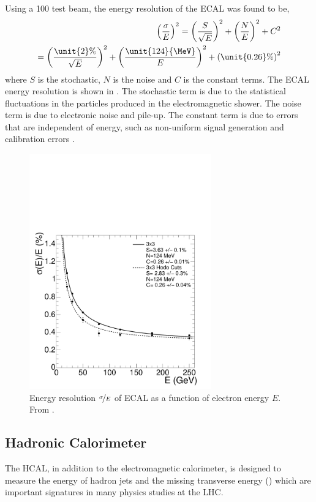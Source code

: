 Using a \unit{100}{\GeV} test beam, the energy resolution of the \ac{ECAL} was
found to be\cite{tdr},
\begin{align}
\left(\frac{\sigma}{E}\right)^{2} 
= \left(\frac{S}{\sqrt{E}}\right)^{2} + \left(\frac{N}{E}\right)^{2} + C^{2}\\
=
\left(\frac{\unit{2}{\%}}{\sqrt{E}}\right)^{2} +
\left(\frac{\unit{124}{\MeV}}{E}\right)^{2} + 
\left(\unit{0.26}{\%}\right)^{2}  
\end{align}
where $S$ is the stochastic, $N$ is the noise and $C$ is the constant terms.
The \ac{ECAL} energy resolution is shown in .  The
stochastic term is due to the statistical fluctuations in the particles produced
in the electromagnetic shower. The noise term is due to electronic noise and
pile-up. The constant term is due to errors that are independent of energy, such
as non-uniform signal generation and calibration errors \cite{cms}.

\begin{figure}[htbp]
  \centering
  \includegraphics[width=0.7\textwidth]{ecal_performance}
  \caption{Energy resolution $\nicefrac{\sigma}{E}$ of ECAL as a function of
\label{fig:ECAL} electron energy $E$. From \cite{cms}.}
\end{figure}

\subsection{Hadronic Calorimeter}
The \acf{HCAL}, in addition to the electromagnetic calorimeter,
is designed to measure the energy of hadron jets and the missing transverse
energy (\met) which are important signatures in many physics studies at the LHC.

